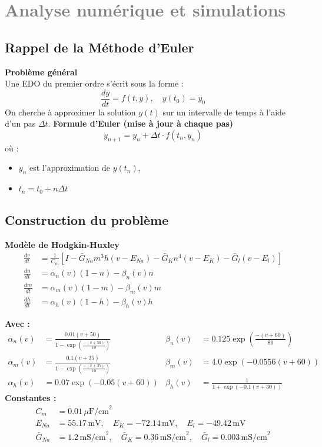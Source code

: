 \chapter{\textcolor{gray}{Analyse numérique et simulations}}
\section{Rappel de la Méthode d'Euler\cite{siciliano2012hodgkin}}
		\textbf{Problème général}\\
		Une EDO du premier ordre s'écrit sous la forme :
		\[
		\frac{dy}{dt} = f(t, y), \quad y(t_0) = y_0
		\]
		On cherche à approximer la solution $y(t)$ sur un intervalle de temps à l'aide d'un pas $\Delta t$.
		\vspace{0.5cm}
		\textbf{Formule d'Euler (mise à jour à chaque pas)}
		\[
		y_{n+1} = y_n + \Delta t \cdot f(t_n, y_n)
		\]
		où :
		\begin{itemize}
			\item $y_n$ est l'approximation de $y(t_n)$,
			\item $t_n = t_0 + n\Delta t$
		\end{itemize}
\section{Construction du problème}
	\textbf{Modèle de Hodgkin-Huxley} \\
		\begin{align*}
			\frac{dv}{dt} &= \frac{1}{C_m} \left[ I - \bar{G}_{Na} m^3 h (v - E_{Na}) - \bar{G}_K n^4 (v - E_K) - \bar{G}_l (v - E_l) \right] \\
			\frac{dn}{dt} &= \alpha_n(v)(1 - n) - \beta_n(v)n \\
			\frac{dm}{dt} &= \alpha_m(v)(1 - m) - \beta_m(v)m \\
			\frac{dh}{dt} &= \alpha_h(v)(1 - h) - \beta_h(v)h
		\end{align*}
		
		\noindent \textbf{Avec :}
		\begin{align*}
			\alpha_n(v) &= \frac{0.01(v + 50)}{1 - \exp\left( \frac{-(v + 50)}{10} \right)} 
			&\beta_n(v) &= 0.125 \exp\left( \frac{-(v + 60)}{80} \right) \\
			\alpha_m(v) &= \frac{0.1(v + 35)}{1 - \exp\left( \frac{-(v + 35)}{10} \right)} 
			&\beta_m(v) &= 4.0 \exp\left( -0.0556(v + 60) \right) \\
			\alpha_h(v) &= 0.07 \exp\left( -0.05(v + 60) \right)
			&\beta_h(v) &= \frac{1}{1 + \exp(-0.1(v + 30))}
		\end{align*}
		\vspace{0.5em}
		\noindent \textbf{Constantes :}
		\begin{align*}
			C_m &= 0.01 \, \mu\text{F/cm}^2 \\
			E_{Na} &= 55.17 \, \text{mV}, \quad
			E_K = -72.14 \, \text{mV}, \quad
			E_l = -49.42 \, \text{mV} \\
			\bar{G}_{Na} &= 1.2 \, \text{mS/cm}^2, \quad
			\bar{G}_K = 0.36 \, \text{mS/cm}^2, \quad
			\bar{G}_l = 0.003 \, \text{mS/cm}^2
		\end{align*}
	

